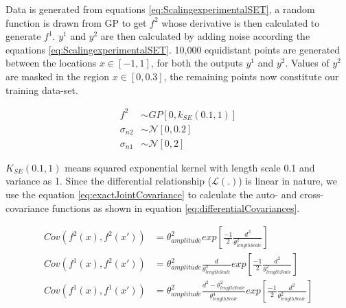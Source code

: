 Data is generated from equations \ref{eq:ScalingexperimentalSET}, a random function is drawn from GP to get \(f^{2}\) whose derivative is then calculated to generate \(f^{1}\). \(y^{1}\) and \(y^{2}\) are then calculated by adding noise according the  equations \ref{eq:ScalingexperimentalSET}. 10,000 equidistant points are generated between the locations $x \in [-1, 1]$, for both the outputs \(y^{1}\) and \(y^{2}\). Values of \(y^{2}\) are masked in the region \(x \in [0, 0.3]\), the remaining points now constitute our training data-set. 

\begin{equation}\label{eq:ScalingexperimentalSET}
    \begin{aligned}
    f^{2} & \sim  GP[0, k_{SE}(0.1, 1)] \\
\sigma_{n2} & \sim \mathcal{N}[0, 0.2] \\
\sigma_{n1} & \sim \mathcal{N}[0, 2]
    \end{aligned}
\end{equation}

\(K_{SE}(0.1, 1)\) means squared exponential kernel with length scale 0.1 and variance as 1. Since the differential relationship (\(\mathcal{L}(.)\)) is linear in nature, we use the equation \ref{eq:exactJointCovariance} to calculate the auto- and cross-covariance functions as shown in equation \ref{eq:differentialCovariances}.

\begin{equation}\label{eq:differentialCovariances}
    \begin{aligned}
Cov(f^2(x), f^2(x')) & = \theta_{amplitude}^{2}exp \left [\frac{-1}{2}\frac{d^{2}}{\theta_{lengthScale}^2} \right] \\    
Cov(f^1(x), f^2(x')) & = \theta_{amplitude}^{2}\frac{d}{\theta_{lengthScale}^2}exp\left [\frac{-1}{2}\frac{d^{2}}{\theta_{lengthScale}^2}\right] \\
Cov(f^1(x), f^1(x')) & = \theta_{amplitude}^{2}\frac{d^{2}-\theta_{lengthScale}^{2}}{\theta_{lengthScale}^{4}}exp\left [\frac{-1}{2}\frac{d^{2}}{\theta_{lengthScale}^{2}}\right]
    \end{aligned}
\end{equation}

